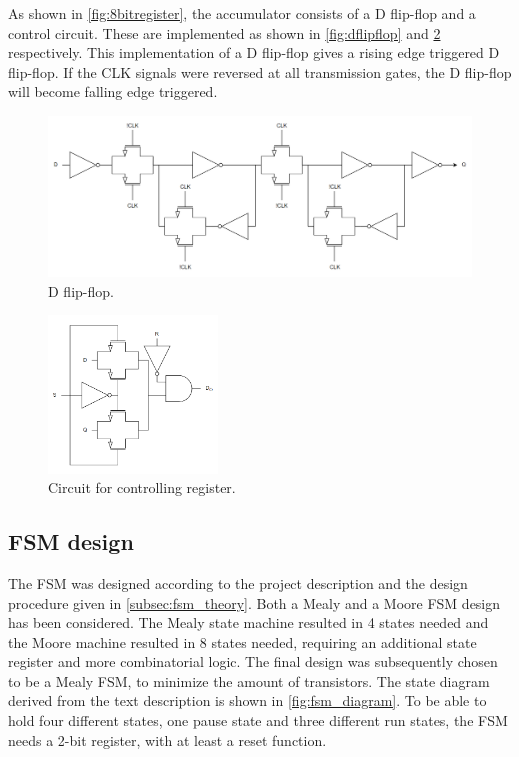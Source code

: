 As shown in \autoref{fig:8bitregister}, the accumulator consists of a D flip-flop and a control circuit. These are implemented as shown in \autoref{fig:dflipflop} \cite[p.18]{digital_design} and \ref{fig:setreset} respectively. This implementation of a D flip-flop gives a rising edge triggered D flip-flop. If the CLK signals were reversed at all transmission gates, the D flip-flop will become falling edge triggered.  

\begin{figure}[H]
    \centering
    \includegraphics[width=\textwidth]{Figures/D_Flip_Flop.png}
    \caption{D flip-flop.}
    \label{fig:dflipflop}
\end{figure}

\begin{figure}[H]
    \centering
    \includegraphics[width=0.4\textwidth]{Figures/setReset.png}
    \caption{Circuit for controlling register.}
    \label{fig:setreset}
\end{figure}

\subsection{FSM design}

The FSM was designed according to the project description and the design procedure given in \autoref{subsec:fsm_theory}. Both a Mealy and a Moore FSM design has been considered. The Mealy state machine resulted in 4 states needed and the Moore machine resulted in 8 states needed, requiring an additional state register and more combinatorial logic. The final design was subsequently chosen to be a Mealy FSM, to minimize the amount of transistors. The state diagram derived from the text description is shown in \autoref{fig:fsm_diagram}. To be able to hold four different states, one pause state and three different run states, the FSM needs a 2-bit register, with at least a reset function. 

